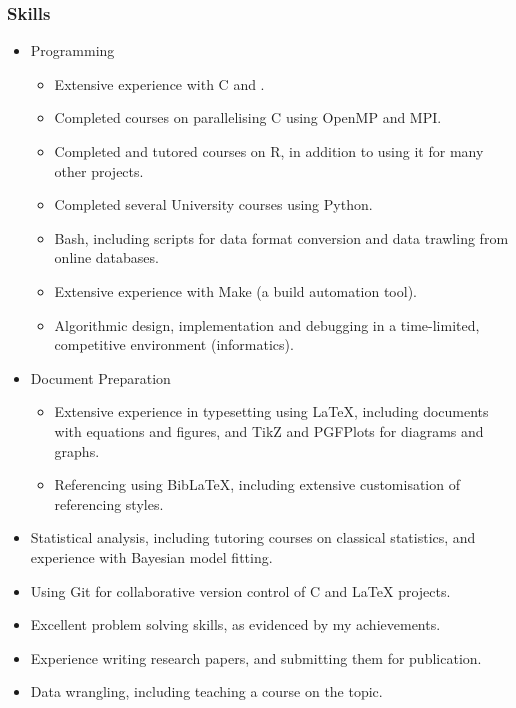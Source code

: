 \documentclass[a4paper,10pt]{article}
\begin{document}
\subsubsection*{Skills}
\begin{itemize}
\item Programming
\begin{itemize}
\item Extensive experience with C and \cpluspluslogo.
\item Completed courses on parallelising C using OpenMP and MPI.
\item Completed and tutored courses on R, in addition to using it for many other projects.
\item Completed several University courses using Python.
\item Bash, including scripts for data format conversion and data trawling from online databases.
\item Extensive experience with Make (a build automation tool).
\item Algorithmic design, implementation and debugging in a time-limited, competitive environment (informatics).
\end{itemize}
\item Document Preparation
\begin{itemize}
\item Extensive experience in typesetting using LaTeX, including documents with equations and figures, and TikZ and PGFPlots for diagrams and graphs.
\item Referencing using BibLaTeX, including extensive customisation of referencing styles.
\end{itemize}
\item Statistical analysis, including tutoring courses on classical statistics, and experience with Bayesian model fitting.
\item Using Git for collaborative version control of C and LaTeX projects.
\item Excellent problem solving skills, as evidenced by my achievements.
\item Experience writing research papers, and submitting them for publication.
\item Data wrangling, including teaching a course on the topic.
\end{itemize}
\end{document}
